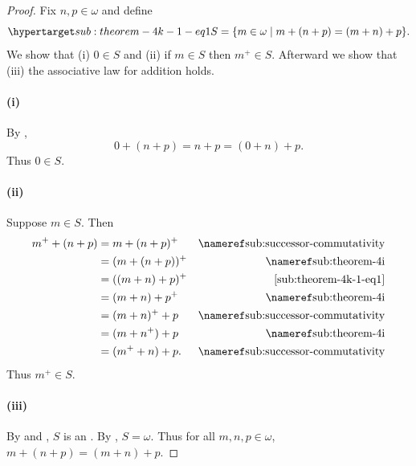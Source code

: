 \documentclass{report}
\begin{document}
  \begin{proof}

    Fix $n, p \in \omega$ and define
      \begin{equation}
        \hyperlabel{sub:theorem-4k-1-eq1}
        S = \{m \in \omega \mid m + (n + p) = (m + n) + p\}.
      \end{equation}
    We show that (i) $0 \in S$ and (ii) if $m \in S$ then $m^+ \in S$.
    Afterward we show that (iii) the associative law for addition holds.

    \paragraph{(i)}%

      By ,
        $$0 + (n + p) = n + p = (0 + n) + p.$$
      Thus $0 \in S$.

    \paragraph{(ii)}%

      Suppose $m \in S$.
      Then
        \begin{align*}
          m^+ + (n + p)
            & = m + (n + p)^+ & \textref{sub:successor-commutativity} \\
            & = (m + (n + p))^+ & \textref{sub:theorem-4i} \\
            & = ((m + n) + p)^+ & \eqref{sub:theorem-4k-1-eq1} \\
            & = (m + n) + p^+ & \textref{sub:theorem-4i} \\
            & = (m + n)^+ + p & \textref{sub:successor-commutativity} \\
            & = (m + n^+) + p & \textref{sub:theorem-4i} \\
            & = (m^+ + n) + p. & \textref{sub:successor-commutativity}
        \end{align*}
      Thus $m^+ \in S$.

    \paragraph{(iii)}%

      By  and , $S$ is
        an .
      By , $S = \omega$.
      Thus for all $m, n, p \in \omega$, $m + (n + p) = (m + n) + p$.

  \end{proof}
\end{document}
